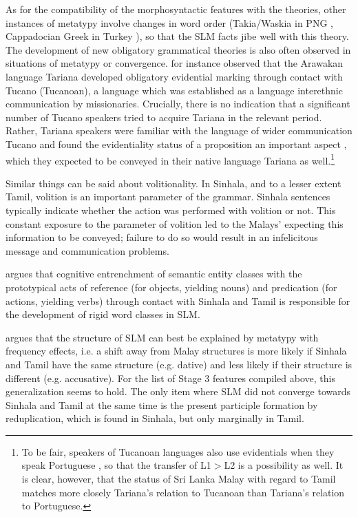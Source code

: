 As for the compatibility of the morphosyntactic features with the theories, other instances of metatypy involve changes in word order (Takia/Waskia in PNG \citep{Ross1996,Ross1997,Ross2001,Ross2003diagnosing,Ross2007}, Cappadocian Greek in Turkey \citep{Dawkins1916}), so that the SLM facts jibe well with this theory. The development of new obligatory grammatical theories is also often observed in situations of metatypy or convergence. \citet[117ff]{Aikhenvald2002lc} for instance observed that the Arawakan language Tariana developed obligatory evidential marking through contact with Tucano (Tucanoan), a language which was established as a language interethnic communication by missionaries. Crucially, there is no indication that a significant number of Tucano speakers tried to acquire Tariana in the relevant period. Rather, Tariana speakers were familiar with the language of wider communication Tucano and found the evidentiality status of a proposition an important aspect  \citep[296]{Aikhenvald2004evid}, which they expected to be conveyed in their native language Tariana as well.\footnote{To be fair, speakers of Tucanoan languages also use evidentials when they speak Portuguese \citep[298]{Aikhenvald2004evid}, so that the transfer of L1$>$L2 is a possibility as well. It is clear, however, that the status of Sri Lanka Malay with regard to Tamil matches more closely Tariana's relation to Tucanoan than Tariana's relation to Portuguese.}

Similar things can be said about volitionality. In Sinhala, and to a lesser extent Tamil, volition is an important parameter of the grammar. Sinhala sentences typically indicate whether the action was performed with volition or not. This constant exposure to the parameter of volition led to the Malays' expecting this information to be conveyed; failure to do so would result in an infelicitous message and communication problems.

\citet{Nordhofffcjoat} argues that cognitive entrenchment of semantic entity classes with the prototypical acts of reference (for objects, yielding nouns) and predication (for actions, yielding verbs) through contact with Sinhala and Tamil is responsible for the development of rigid word classes in SLM.


\citet{Ansaldo2008genesis, Ansaldo2009book} argues that the structure of SLM can best be explained by metatypy with frequency effects, i.e. a shift away from Malay structures is more likely if Sinhala and Tamil have the same structure (e.g. dative) and less likely if their structure is different (e.g. accusative). For the list of Stage 3 features compiled above, this generalization seems to hold. The only item where SLM did not converge towards Sinhala and Tamil at the same time is the present participle formation by reduplication, which is found in Sinhala, but only marginally in Tamil.



